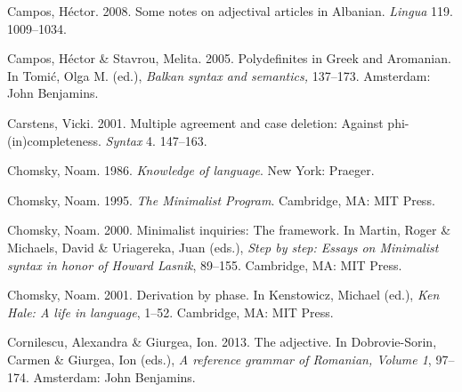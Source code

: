 \documentclass[output=paper]{langsci/langscibook}
\begin{document}
\begin{styleSfondomedioiColorexi}
Campos, Héctor. 2008. Some notes on adjectival articles in Albanian. \textit{Lingua} 119. 1009–1034.
\end{styleSfondomedioiColorexi}

\begin{styleSfondomedioiColorexi}
Campos, Héctor \& Stavrou, Melita. 2005. Polydefinites in Greek and Aromanian. In Tomić, Olga M. (ed.), \textit{Balkan syntax and semantics,} 137–173. Amsterdam: John Benjamins.
\end{styleSfondomedioiColorexi}

\begin{styleSfondomedioiColorexxi}
Carstens, Vicki. 2001. Multiple agreement and case deletion: Against phi-(in)completeness. \textit{Syntax} 4. 147–163.
\end{styleSfondomedioiColorexxi}

\begin{styleSfondomedioiColorexi}
Chomsky, Noam. 1986. \textit{Knowledge of language}. New York: Praeger.
\end{styleSfondomedioiColorexi}

\begin{styleSfondomedioiColorexi}
Chomsky, Noam. 1995. \textit{The Minimalist Program}. Cambridge, MA: MIT Press.
\end{styleSfondomedioiColorexi}

\begin{styleSfondomedioiColorexi}
Chomsky, Noam. 2000. Minimalist inquiries: The framework. In Martin, Roger \& Michaels, David \& Uriagereka, Juan (eds.), \textit{Step by step: Essays on Minimalist syntax in honor of Howard Lasnik}, 89–155. Cambridge, MA: MIT Press. 
\end{styleSfondomedioiColorexi}

\begin{styleSfondomedioiColorexi}
Chomsky, Noam. 2001. Derivation by phase. In Kenstowicz, Michael (ed.), \textit{Ken Hale: A life in language}, 1–52. Cambridge, MA: MIT Press.
\end{styleSfondomedioiColorexi}

\begin{styleSfondomedioiColorexxi}
Cornilescu, Alexandra \& Giurgea, Ion. 2013. The adjective. In Dobrovie-Sorin, Carmen \& Giurgea, Ion (eds.), \textit{A reference grammar of Romanian, Volume 1}, 97–174. Amsterdam: John Benjamins. 
\end{styleSfondomedioiColorexxi}
\end{document}
